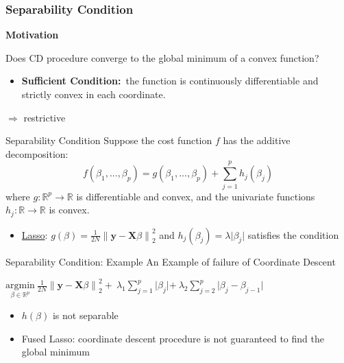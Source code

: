 \documentclass{beamer}
\begin{document}
\begin{frame}
\frametitle{Separability Condition}
\textbf{Motivation} 
\vspace*{6mm}
\begin{block}{Does CD procedure converge to the global minimum of a convex function? }
\vspace*{3mm}
 {
\begin{itemize}
    \item \textbf{Sufficient Condition:}\  the function is continuously differentiable and strictly convex in each coordinate. 
\end{itemize}
$\Rightarrow$  restrictive 

}

\end{block}
    
\end{frame}

\begin{frame}{Separability Condition}
Suppose the cost function \(f\) has the additive decomposition:
\begin{equation}
    f(\beta_1,...,\beta_p)=g(\beta_1,...,\beta_p)+\displaystyle\sum_{j=1}^{p} h_j(\beta_j)
\end{equation}
where \(g:\mathbb{R}^p \rightarrow \mathbb{R}\) is differentiable and convex, and the univariate functions  \(h_j:\mathbb{R} \rightarrow \mathbb{R}\) is convex. 
\vspace*{6mm}
\begin{itemize}
    \item \underline{Lasso}: \(g(\beta)=\frac{1}{2N}{\lVert\textbf{y}-\textbf{X}\beta\rVert}^2_2 \) and \(h_j(\beta_j)=\lambda\lvert\beta_j\lvert\) satisfies the condition
\end{itemize}
    
\end{frame}


\begin{frame}{Separability Condition: Example}
An Example of failure of Coordinate Descent 


\vspace*{6mm}
\(\underset{\beta\in\mathbb{R}^p}{\mathrm{argmin}}\ \frac{1}{2N}{\lVert\textbf{y}-\textbf{X}\beta\rVert}^2_2 + \ \lambda_{1}\sum_{j=1}^{p}\lvert\beta_j\lvert+\ \lambda_{2}\sum_{j=2}^{p}\lvert\beta_j-\beta_{j-1}\lvert\)

\vspace*{6mm}
\begin{itemize}
    \item \(h(\beta)\) is not separable
\end{itemize}
\begin{itemize}
    \item Fused Lasso: coordinate descent procedure is not guaranteed to find the global minimum
\end{itemize}


    
\end{frame}
\end{document}
